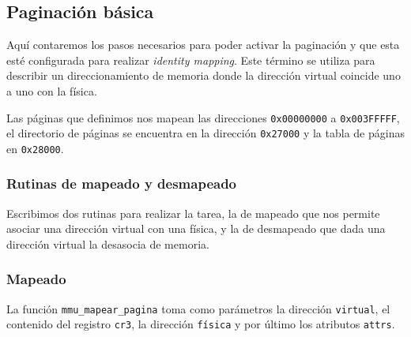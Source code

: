 \subsection{Paginación básica}

Aquí contaremos los pasos necesarios para poder activar la paginación y que esta
esté configurada para realizar \textit{identity mapping}. Este término se
utiliza para describir un direccionamiento de memoria donde la dirección virtual
coincide uno a uno con la física.

Las páginas que definimos nos mapean las direcciones
\texttt{0x00000000} a \texttt{0x003FFFFF}, el directorio de páginas se encuentra
en la dirección \texttt{0x27000} y la tabla de páginas en \texttt{0x28000}.

\subsubsection{Rutinas de mapeado y desmapeado}

Escribimos dos rutinas para realizar la tarea, la de mapeado que nos permite
asociar una dirección virtual con una física, y la de desmapeado que dada una
dirección virtual la desasocia de memoria.

\subsubsection*{Mapeado}

La función \texttt{mmu\_mapear\_pagina} toma como parámetros la dirección \texttt{virtual}, el contenido del
registro \texttt{cr3}, la dirección \texttt{física} y por último los atributos
\texttt{attrs}.

